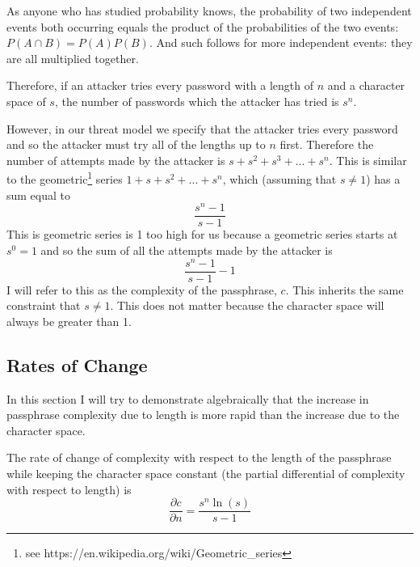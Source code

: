 \documentclass[11pt,a4paper]{article}
\begin{document}
As anyone who has studied probability knows, the probability of two independent events both occurring equals the product of the probabilities of the two events: $P(A \cap B)=P(A)P(B)$. And such follows for more independent events: they are all multiplied together.


Therefore, if an attacker tries every password with a length of $n$ and a character space of $s$, the number of passwords which the attacker has tried is $s^n$.

However, in our threat model we specify that the attacker tries every password and so the attacker must try all of the lengths up to $n$ first. Therefore the number of attempts made by the attacker is $s + s^2 + s^3 +...+s^n$. This is similar to the geometric\footnote{see https://en.wikipedia.org/wiki/Geometric\_series} series $1 + s + s^2 +...+s^n$, which (assuming that $s \ne 1$) has a sum equal to \[\frac{s^n - 1}{s-1}\]This is geometric series is 1 too high for us because a geometric series starts at $s^0=1$ and so the sum of all the attempts made by the attacker is \[\frac{s^n - 1}{s-1} -1\]I will refer to this as the complexity of the passphrase, $c$. This inherits the same constraint that $s \ne 1$. This does not matter because the character space will always be greater than 1.

\subsection{Rates of Change}
In this section I will try to demonstrate algebraically that the increase in passphrase complexity due to length is more rapid than the increase due to the character space. 

The rate of change of complexity with respect to the length of the passphrase while keeping the character space constant (the partial differential of complexity with respect to length) is \[ \frac{\partial c}{\partial n} = \frac{s^n \ln(s)}{s-1}\]
\end{document}
